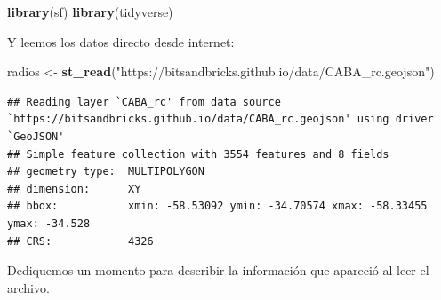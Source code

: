 \documentclass[spanish,]{book}
\newenvironment{Shaded}{\begin{snugshade}}{\end{snugshade}}
\newcommand{\KeywordTok}[1]{\textcolor[rgb]{0.13,0.29,0.53}{\textbf{#1}}}
\newcommand{\NormalTok}[1]{#1}
\newcommand{\StringTok}[1]{\textcolor[rgb]{0.31,0.60,0.02}{#1}}
\begin{document}
\begin{Shaded}
\begin{Highlighting}[]
\KeywordTok{library}\NormalTok{(sf)}
\KeywordTok{library}\NormalTok{(tidyverse)}
\end{Highlighting}
\end{Shaded}

Y leemos los datos directo desde internet:

\begin{Shaded}
\begin{Highlighting}[]
\NormalTok{radios <-}\StringTok{ }\KeywordTok{st_read}\NormalTok{(}\StringTok{"https://bitsandbricks.github.io/data/CABA_rc.geojson"}\NormalTok{)}
\end{Highlighting}
\end{Shaded}

\begin{verbatim}
## Reading layer `CABA_rc' from data source `https://bitsandbricks.github.io/data/CABA_rc.geojson' using driver `GeoJSON'
## Simple feature collection with 3554 features and 8 fields
## geometry type:  MULTIPOLYGON
## dimension:      XY
## bbox:           xmin: -58.53092 ymin: -34.70574 xmax: -58.33455 ymax: -34.528
## CRS:            4326
\end{verbatim}

Dediquemos un momento para describir la información que apareció al leer el archivo.
\end{document}
